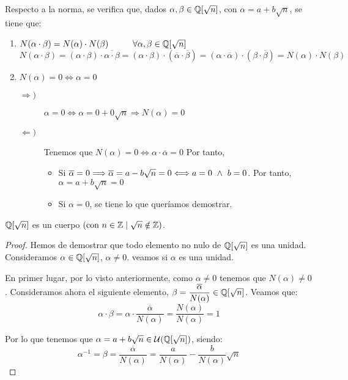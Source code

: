 Respecto a la norma, se verifica que, dados $\alpha, \beta \in \mathbb Q[\sqrt{n}]$, con $\alpha=a+b\sqrt{n}$, se tiene que:
\begin{enumerate}
    \item $N(\alpha \cdot \beta) = N(\alpha) \cdot N(\beta) \hspace{1cm} \forall \alpha, \beta \in \mathbb Q[\sqrt{n}]$
    \begin{equation*}
        N(\alpha \cdot \beta)
        = (\alpha \cdot \beta) \cdot \overline{\alpha \cdot \beta}
        = (\alpha \cdot \beta) \cdot (\overline{\alpha} \cdot \overline{\beta})
        = (\alpha \cdot \overline{\alpha}) \cdot (\beta \cdot \overline{\beta})
        = N(\alpha) \cdot N(\beta)
    \end{equation*}

    \item $N(\alpha) = 0 \Longleftrightarrow \alpha = 0$
    \begin{description}
        \item[$\Longrightarrow)$] $\alpha = 0 \Longleftrightarrow \alpha = 0 + 0\sqrt{n} \Longrightarrow N(\alpha) = 0$

        \item[$\Longleftarrow)$] Tenemos que $N(\alpha) = 0 \Longleftrightarrow \alpha \cdot \overline{\alpha} = 0$
        Por tanto,
        \begin{itemize}
            \item Si $\overline{\alpha} = 0 \Longrightarrow \overline{\alpha} = a-b\sqrt{n} = 0 \Longleftrightarrow a = 0 \ \land \  b = 0$. Por tanto, $\alpha=a+b\sqrt{n} = 0$

            \item Si $\alpha = 0$, se tiene lo que queríamos demostrar.
        \end{itemize}
    \end{description}
\end{enumerate}

\begin{prop}
    $\mathbb Q[\sqrt{n}]$ es un cuerpo $(\mbox{con } n \in \mathbb Z \mid \sqrt{n} \notin \mathbb Z)$.
\end{prop}
\begin{proof}
    Hemos de demostrar que todo elemento no nulo de $\mathbb Q[\sqrt{n}]$ es una unidad. Consideramos $\alpha\in \mathbb Q[\sqrt{n}]$, $\alpha\neq 0$. veamos si $\alpha$ es una unidad.

    En primer lugar, por lo visto anteriormente, como $\alpha\neq 0$ tenemos que $N(\alpha)\neq 0$. Consideramos ahora el siguiente elemento, $\beta = \dfrac{\overline{\alpha}}{N(\alpha)} \in \mathbb Q[\sqrt{n}]$. Veamos que:
    $$\alpha \cdot \beta = \alpha \cdot \dfrac{\overline{\alpha}}{N(\alpha)} = \frac{N(\alpha)}{N(\alpha)}= 1$$
    
    Por lo que tenemos que $\alpha=a+b\sqrt{n} \in \mathcal{U}(\mathbb Q[\sqrt{n}])$, siendo: $$\alpha^{-1} = \beta = \frac{\overline{\alpha}}{N(\alpha)} = \frac{a}{N(\alpha)} - \frac{b}{N(\alpha)}\sqrt{n}$$
\end{proof}

